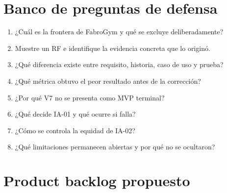 \documentclass[11pt,a4paper]{article}
\begin{document}
\section{Banco de preguntas de defensa}
\begin{enumerate}
\item ¿Cuál es la frontera de FabroGym y qué se excluye deliberadamente?
\item Muestre un RF e identifique la evidencia concreta que lo originó.
\item ¿Qué diferencia existe entre requisito, historia, caso de uso y prueba?
\item ¿Qué métrica obtuvo el peor resultado antes de la corrección?
\item ¿Por qué V7 no se presenta como MVP terminal?
\item ¿Qué decide IA-01 y qué ocurre si falla?
\item ¿Cómo se controla la equidad de IA-02?
\item ¿Qué limitaciones permanecen abiertas y por qué no se ocultaron?
\end{enumerate}

\section{Product backlog propuesto}

\end{document}
